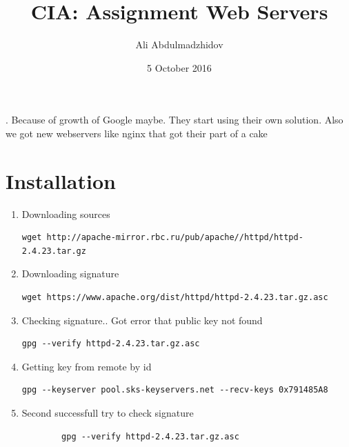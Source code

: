 \documentclass[10pt]{article}
\title{CIA: Assignment Web Servers}
\date{5 October 2016}
\author{Ali Abdulmadzhidov}
\begin{document}
\renewcommand*\rmdefault{cmss}
. Because of growth of Google maybe. They start using their own solution. Also we got new webservers like nginx that got their part of a cake
\section{Installation}
\begin{enumerate}
    \item Downloading sources
    \begin{verbatim}wget http://apache-mirror.rbc.ru/pub/apache//httpd/httpd-2.4.23.tar.gz\end{verbatim}
    \item Downloading signature
    \begin{verbatim}wget https://www.apache.org/dist/httpd/httpd-2.4.23.tar.gz.asc\end{verbatim}
    \item Checking signature.. Got error that public key not found
    \begin{verbatim}gpg --verify httpd-2.4.23.tar.gz.asc\end{verbatim}
    \item Getting key from remote by id
    \begin{verbatim}gpg --keyserver pool.sks-keyservers.net --recv-keys 0x791485A8 \end{verbatim}
    \item Second successfull try to check signature
    \begin{verbatim}
        gpg --verify httpd-2.4.23.tar.gz.asc


\end{verbatim}
\end{enumerate}
\end{document}
